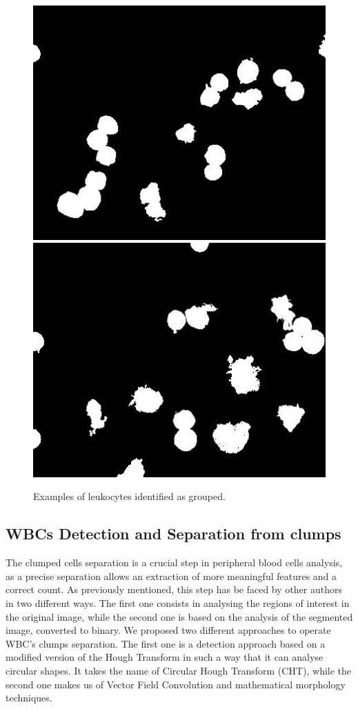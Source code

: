 \documentclass[final,a4paper,12pt,english]{UnicaPhdThesis3}
\begin{document}
	\begin{figure}[!htbp]
		\centering
		\includegraphics[height=0.27\textheight]{images/Fig12-1}
		\includegraphics[height=0.27\textheight]{images/Fig12-2}
		\caption{\label{fig:example10}Examples of leukocytes identified as grouped.}
	\end{figure}
	
	\subsection{WBCs Detection and Separation from clumps}
	The clumped cells separation is a crucial step in peripheral blood cells analysis, as a precise separation allows an extraction of more meaningful features and a correct count. As previously mentioned, this step has be faced by other authors in two different ways. The first one consists in analysing the regions of interest in the original image, while the second one is based on the analysis of the segmented image, converted to binary. We proposed two different approaches to operate WBC's clumps separation. The first one is a detection approach based on a modified version of the Hough Transform in such a way that it can analyse circular shapes. It takes the name of Circular Hough Transform (CHT), while the second one makes us of Vector Field Convolution and mathematical morphology techniques. 
	
\end{document}
